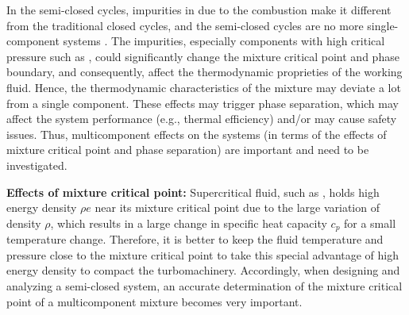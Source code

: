 In the semi-closed  cycles, impurities in  due to the combustion make it different from the traditional closed  cycles, and the semi-closed  cycles are no more single-component systems \cite{abdul2017cfd,barak2020ignition}.
The impurities, especially components with high critical pressure such as , could significantly change the mixture critical point and phase boundary, and consequently, affect the thermodynamic proprieties of the working fluid. Hence, the thermodynamic characteristics of the mixture may deviate a lot from a single component. These effects may trigger phase separation, which may affect the system performance (e.g., thermal efficiency) and/or may cause safety issues. Thus, multicomponent effects on the  systems (in terms of the effects of mixture critical point and phase separation) are important and need to be investigated.

\textbf{Effects of mixture critical point:}
Supercritical fluid, such as , holds high energy density $\rho e$ near its mixture critical point due to the large variation of density $\rho$, which results in a large change in specific heat capacity $c_p$ for a small temperature change. Therefore, it is better to keep the fluid temperature and pressure close to the mixture critical point to take this special advantage of high energy density to compact the turbomachinery. Accordingly, when designing and analyzing a semi-closed  system, an accurate determination of the mixture critical point of a multicomponent mixture becomes very important.%

